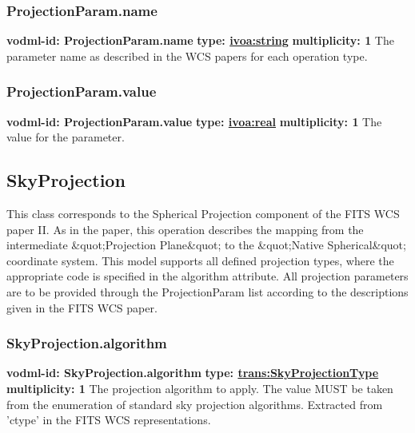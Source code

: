     \subsubsection{ProjectionParam.name}
      \textbf{vodml-id: ProjectionParam.name} \newline
      \textbf{type: \hyperref[sect:ivoa]{ivoa:string}} \newline
      \textbf{multiplicity: 1} \newline 
      The parameter name as described in the WCS papers for each operation type.

    \subsubsection{ProjectionParam.value}
      \textbf{vodml-id: ProjectionParam.value} \newline
      \textbf{type: \hyperref[sect:ivoa]{ivoa:real}} \newline
      \textbf{multiplicity: 1} \newline 
      The value for the parameter.

  \subsection{SkyProjection}
  \label{sect:SkyProjection}
    This class corresponds to the Spherical Projection component of the FITS WCS paper II. As in the paper, this operation describes the mapping from the intermediate \&quot;Projection Plane\&quot; to the \&quot;Native Spherical\&quot; coordinate system. This model supports all defined projection types, where the appropriate code is specified in the algorithm attribute. All projection parameters are to be provided through the ProjectionParam list according to the descriptions given in the FITS WCS paper.

    \subsubsection{SkyProjection.algorithm}
      \textbf{vodml-id: SkyProjection.algorithm} \newline
      \textbf{type: \hyperref[sect:SkyProjectionType]{trans:SkyProjectionType}} \newline
      \textbf{multiplicity: 1} \newline 
      The projection algorithm to apply. The value MUST be taken from the enumeration of standard sky projection algorithms. Extracted from 'ctype' in the FITS WCS representations.

